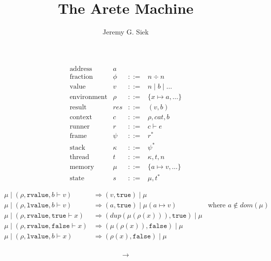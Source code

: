 \documentclass{article}
\title{The Arete Machine}
\author{Jeremy G. Siek}
\begin{document}
\maketitle

\[
\begin{array}{lrcl}
  \text{address} & a \\
  \text{fraction} & \phi & ::= & n \div n \\
  \text{value}& v & ::= & n \mid b \mid \ldots \\
  \text{environment} & \rho & ::= & \{ x \mapsto a, \ldots \} \\
  \text{result} & \mathit{res} & ::= & (v , b) \\
  \text{context} & c & ::= & \rho, \mathit{cat}, b \\
  \text{runner}& r & ::= & c \vdash e\\
  \text{frame}& \psi & ::= & r^{*} \\
  \text{stack}& \kappa & ::= & \psi^{*} \\
  \text{thread}& t & ::= & \kappa, t, n \\
  \text{memory}& \mu & ::= & \{ a \mapsto v, \ldots \} \\
  \text{state}& s & ::= & \mu, t^{*}
\end{array}
\]

\begin{align*}
\mu \mid (\rho,\mathtt{rvalue},b\vdash v) &\Rightarrow (v, \mathtt{true}) \mid \mu \\
\mu \mid (\rho,\mathtt{lvalue},b\vdash v) &\Rightarrow (a, \mathtt{true}) \mid \mu(a \mapsto v) & \text{where } a \notin \mathit{dom}(\mu) \\[2ex]
\mu \mid (\rho,\mathtt{rvalue}, \mathtt{true} \vdash x) &
    \Rightarrow (\mathit{dup}(\mu(\rho(x))), \mathtt{true}) \mid \mu\\
\mu \mid (\rho,\mathtt{rvalue}, \mathtt{false} \vdash x) &
      \Rightarrow (\mu(\rho(x)), \mathtt{false}) \mid \mu\\
\mu \mid (\rho,\mathtt{lvalue}, b \vdash x) &\Rightarrow (\rho(x), \mathtt{false}) \mid \mu \\[2ex]
\end{align*}


\begin{align*}
  \longrightarrow
\end{align*}
\end{document}
